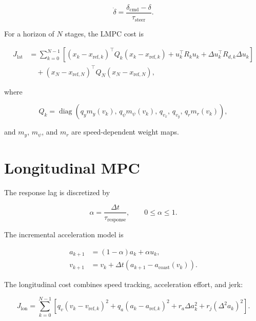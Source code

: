 \documentclass[9pt]{article}
\begin{document}
\begin{equation}
\dot\delta
=
\frac{\delta_{\mathrm{cmd}}-\delta}{\tau_{\mathrm{steer}}}.
\label{eq:steer-actuator}
\end{equation}

For a horizon of $N$ stages, the LMPC cost is

\begin{align}
J_{\mathrm{lat}}
&=
\sum_{k=0}^{N-1}
\left[
\left(x_k-x_{\mathrm{ref},k}\right)^{\!\top}
Q_k
\left(x_k-x_{\mathrm{ref},k}\right)
+ u_k^{\!\top} R_k u_k
+ \Delta u_k^{\!\top} R_{d,k}\Delta u_k
\right]
\nonumber\\
&\quad+
\left(x_N-x_{\mathrm{ref},N}\right)^{\!\top}
Q_N
\left(x_N-x_{\mathrm{ref},N}\right),
\label{eq:lateral-cost}
\end{align}

where

\begin{equation}
Q_k=
\operatorname{diag}\!\left(
q_y m_y(v_k),\,
q_\psi m_\psi(v_k),\,
q_{v_x},\,
q_{v_y},\,
q_r m_r(v_k)
\right),
\label{eq:lateral-q}
\end{equation}

and $m_y$, $m_\psi$, and $m_r$ are speed-dependent weight maps.

\section{Longitudinal MPC}

The response lag is discretized by

\begin{equation}
\alpha=\frac{\Delta t}{\tau_{\mathrm{response}}},
\qquad 0\leq\alpha\leq 1.
\label{eq:longitudinal-alpha}
\end{equation}

The incremental acceleration model is

\begin{align}
a_{k+1} &= (1-\alpha)a_k+\alpha u_k,
\label{eq:longitudinal-accel}\\
v_{k+1} &= v_k+\Delta t\left(a_{k+1}-a_{\mathrm{coast}}(v_k)\right).
\label{eq:longitudinal-speed}
\end{align}

The longitudinal cost combines speed tracking, acceleration effort, and jerk:

\begin{equation}
J_{\mathrm{lon}}
=
\sum_{k=0}^{N-1}
\left[
q_v\left(v_k-v_{\mathrm{ref},k}\right)^2
+ q_a\left(a_k-a_{\mathrm{ref},k}\right)^2
+ r_a\Delta a_k^2
+ r_j\left(\Delta^2 a_k\right)^2
\right].
\label{eq:longitudinal-cost}
\end{equation}
\end{document}
